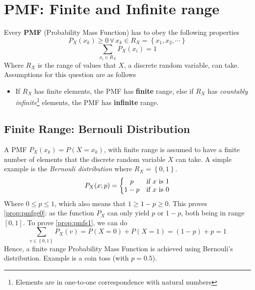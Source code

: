 \documentclass[main.tex]{article}
\begin{document}
    \section[P1: PMF ranges]{PMF: Finite and Infinite range}
    Every \textbf{PMF} (Probability Mass Function) has to obey the following properties
    \begin{equation}
        \label{prop:pmfge0}
        P_X(x_k) \ge 0 \, \forall \, x_k \in R_X = \left \{ x_1, x_2, \cdots  \right \}
    \end{equation}
    \begin{equation}
        \label{prop:pmfs1}
        \sum_{x_i \in R_X} P_X (x_i) = 1
    \end{equation}
    Where $R_X$ is the range of values that $X$, a discrete random variable, can take. Assumptions for this question are as follows
    \begin{itemize}
        \item If $R_X$ has finite elements, the PMF has \textbf{finite} range, else if $R_X$ has \textit{countably infinite}\footnote{Elements are in one-to-one correspondence with natural numbers} elements, the PMF has \textbf{infinite} range.
    \end{itemize}

    \subsection[Finite]{Finite Range: Bernouli Distribution}
    A PMF $P_X (x_k) = P(X = x_k)$, with finite range is assumed to have a finite number of elements that the discrete random variable $X$ can take. A simple example is the \emph{Bernouli distribution} where $R_X = \left \{ 0,1 \right \}$.
    \begin{equation}
        \label{eq:bernouli}
        P_X(x;p) = \left\{\begin{matrix}
        p & \textup{if } x \textup{ is } 1 \\
        1-p & \textup{if } x \textup{ is } 0
        \end{matrix}\right.
    \end{equation}
    Where $0 \le p \le 1$, which also means that $1 \ge 1-p \ge 0$. This proves \ref{prop:pmfge0}: as the function $P_X$ can only yield $p$ or $1-p$, both being in range $[0,1]$. To prove \ref{prop:pmfs1}, we can do
    \begin{equation}
        \label{eq:bernouli-s1}
        \sum_{v \in \left \{ 0,1 \right \}} P_X (v) = P(X=0) + P(X=1) = (1-p) + p = 1
    \end{equation}
    Hence, a finite range Probability Mass Function is achieved using Bernouli's distribution. Example is a coin toss (with $p = 0.5$).
\end{document}
